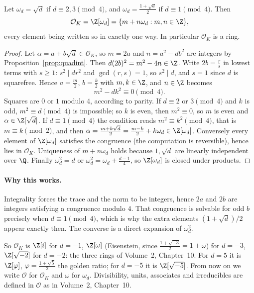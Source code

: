 \begin{proposition}\label{prop:OK}
Let $\omega_d=\sqrt d$ if $d\equiv2,3\pmod4$, and $\omega_d=\frac{1+\sqrt d}2$ if $d\equiv1\pmod4$. Then
\[
\mathcal O_K=\Z[\omega_d]=\{m+n\omega_d:m,n\in\Z\},
\]
every element being written so in exactly one way. In particular $\mathcal O_K$ is a ring.
\end{proposition}
\begin{proof}
Let $\alpha=a+b\sqrt d\in\mathcal O_K$, so $m=2a$ and $n=a^2-db^2$ are integers by Proposition~\ref{prop:quadint}. Then $d(2b)^2=m^2-4n\in\Z$. Write $2b=\frac rs$ in lowest terms with $s\ge1$: $s^2\mid dr^2$ and $\gcd(r,s)=1$, so $s^2\mid d$, and $s=1$ since $d$ is squarefree. Hence $a=\frac m2$, $b=\frac k2$ with $m,k\in\Z$, and $n\in\Z$ becomes
\[
m^2-dk^2\equiv0\pmod4.
\]
Squares are $0$ or $1$ modulo $4$, according to parity. If $d\equiv2$ or $3\pmod4$ and $k$ is odd, $m^2\equiv d\pmod4$ is impossible; so $k$ is even, then $m^2\equiv0$, so $m$ is even and $\alpha\in\Z[\sqrt d]$. If $d\equiv1\pmod4$ the condition reads $m^2\equiv k^2\pmod 4$, that is $m\equiv k\pmod2$, and then $\alpha=\frac{m+k\sqrt d}2=\frac{m-k}2+k\omega_d\in\Z[\omega_d]$. Conversely every element of $\Z[\omega_d]$ satisfies the congruence (the computation is reversible), hence lies in $\mathcal O_K$. Uniqueness of $m+n\omega_d$ holds because $1,\sqrt d$ are linearly independent over $\Q$. Finally $\omega_d^2=d$ or $\omega_d^2=\omega_d+\frac{d-1}4$, so $\Z[\omega_d]$ is closed under products.
\end{proof}

\paragraph{Why this works.}
Integrality forces the trace and the norm to be integers, hence $2a$ and $2b$ are integers satisfying a congruence modulo $4$. That congruence is solvable for odd $b$ precisely when $d\equiv 1\pmod 4$, which is why the extra elements $(1+\sqrt d)/2$ appear exactly then. The converse is a direct expansion of $\omega_d^2$.

So $\mathcal O_K$ is $\Z[i]$ for $d=-1$, $\Z[\omega]$ (Eisenstein, since $\frac{1+\sqrt{-3}}2=1+\omega$) for $d=-3$, $\Z[\sqrt{-2}]$ for $d=-2$: the three rings of Volume~2, Chapter~10. For $d=5$ it is $\Z[\varphi]$, $\varphi=\frac{1+\sqrt5}2$ the golden ratio; for $d=-5$ it is $\Z[\sqrt{-5}]$. From now on we write $\mathcal O$ for $\mathcal O_K$ and $\omega$ for $\omega_d$. Divisibility, units, associates and irreducibles are defined in $\mathcal O$ as in Volume~2, Chapter~10.

